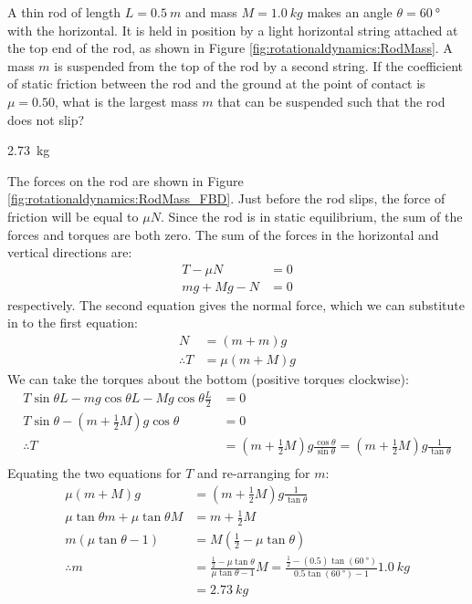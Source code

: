 \question A thin rod of length $L=\SI{0.5}{m}$ and mass $M=\SI{1.0}{kg}$ makes an angle $\theta=\SI{60}{\degree}$ with the horizontal. It is held in position by a light horizontal string attached at the top end of the rod, as shown in Figure \ref{fig:rotationaldynamics:RodMass}. A mass $m$ is suspended from the top of the rod by a second string. If the coefficient of static friction between the rod and the ground at the point of contact is $\mu=0.50$, what is the largest mass $m$ that can be suspended such that the rod does not slip?
\begin{finalanswer}
\SI{2.73}{kg}
\end{finalanswer}
\begin{solution}
The forces on the rod are shown in Figure \ref{fig:rotationaldynamics:RodMass_FBD}. Just before the rod slips, the force of friction will be equal to $\mu N$.
Since the rod is in static equilibrium, the sum of the forces and torques are both zero. The sum of the forces in the horizontal and vertical directions are:
\begin{align*}
T-\mu N&=0\\
mg+Mg-N&=0
\end{align*}
respectively.  The second equation gives the normal force, which we can substitute in to the first equation:
\begin{align*}
N&=(m+m)g\\
\therefore T&=\mu(m+M)g
\end{align*}
We can take the torques about the bottom (positive torques clockwise):
\begin{align*}
T\sin\theta L-mg\cos\theta L-Mg\cos\theta \frac{L}{2}&=0\\
T\sin\theta-(m+\frac{1}{2}M)g\cos\theta&=0\\
\therefore T&=(m+\frac{1}{2}M)g\frac{\cos\theta}{\sin\theta}=(m+\frac{1}{2}M)g\frac{1}{\tan\theta}\\
\end{align*}
Equating the two equations for $T$ and re-arranging for $m$:
\begin{align*}
\mu(m+M)g &= (m+\frac{1}{2}M)g\frac{1}{\tan\theta}\\
\mu\tan\theta m+\mu\tan\theta M&=m+\frac{1}{2}M\\
m(\mu\tan\theta-1) &= M(\frac{1}{2}-\mu\tan\theta)\\
\therefore m&= \frac{\frac{1}{2}-\mu\tan\theta}{\mu\tan\theta-1}M = \frac{\frac{1}{2}-(0.5)\tan(\SI{60}{\degree})}{0.5\tan(\SI{60}{\degree})-1}\SI{1.0}{kg}\\
&=\SI{2.73}{kg}
\end{align*}
\end{solution}

